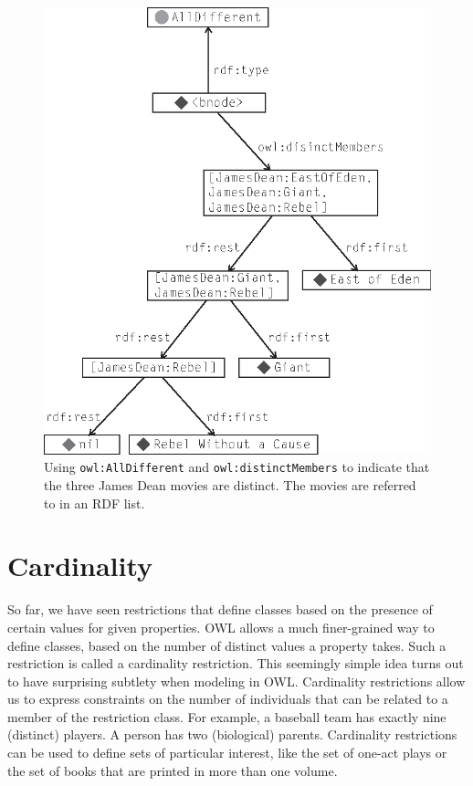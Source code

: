 \begin{figure}
\centering
\includegraphics[width=5in]{media/ch13/f13-02.eps}
\caption{Using \texttt{owl:AllDifferent} and \texttt{owl:distinctMembers} to indicate that the
three James Dean movies are distinct. The movies are referred to in an
RDF list.
}
\label{fig:ch13.02}
\end{figure}


\section{Cardinality}

So far, we have seen restrictions that define classes based on the
presence of certain values for given properties. OWL allows a much
finer-grained way to define classes, based on the number of distinct
values a property takes. Such a restriction is called a cardinality
restriction. This seemingly simple idea turns out to have surprising
subtlety when modeling in OWL. Cardinality restrictions allow us to
express constraints on the number of individuals that can be related to
a member of the restriction class. For example, a baseball team has
exactly nine (distinct) players. A person has two (biological) parents.
Cardinality restrictions can be used to define sets of particular
interest, like the set of one-act plays or the set of books that are
printed in more than one volume.

